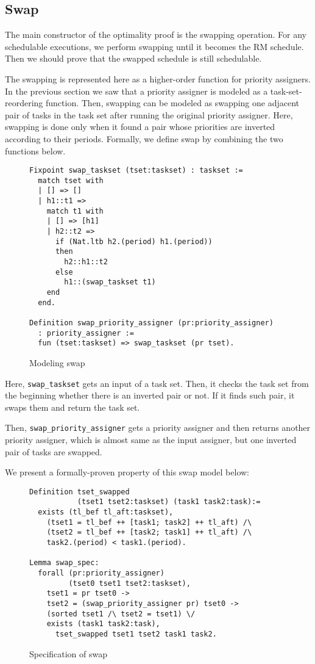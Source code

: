 \documentclass[nocopyrightspace]{sigplanconf}
\begin{document}
\subsection{Swap}

The main constructor of the optimality proof is the swapping operation. For any schedulable executions, we perform
swapping until it becomes the RM schedule. Then we should prove that the swapped schedule is still schedulable.

The swapping is represented here as a higher-order function for priority assigners. In the previous section we saw
that a priority assigner is modeled as a task-set-reordering function. Then, swapping can be modeled as swapping one
adjacent pair of tasks in the task set after running the original priority assigner. Here, swapping is done only when
it found a pair whose priorities are inverted according to their periods. Formally, we define swap by combining the two
functions below.

\begin{figure}[H]
\begin{verbatim}
Fixpoint swap_taskset (tset:taskset) : taskset :=
  match tset with
  | [] => []
  | h1::t1 =>
    match t1 with
    | [] => [h1]
    | h2::t2 =>
      if (Nat.ltb h2.(period) h1.(period))
      then
        h2::h1::t2
      else
        h1::(swap_taskset t1)
    end
  end.

Definition swap_priority_assigner (pr:priority_assigner)
  : priority_assigner :=
  fun (tset:taskset) => swap_taskset (pr tset).
\end{verbatim}
\caption{ Modeling swap }\label{fig:swap}
\end{figure}

Here, \texttt{swap\_taskset} gets an input of a task set. Then, it checks
the task set from the beginning whether there is an inverted pair or not.
If it finds such pair, it swaps them and return the task set.

Then, \texttt{swap\_priority\_assigner} gets a priority assigner and then
returns another priority assigner, which is almost same as the input assigner,
but one inverted pair of tasks are swapped.

We present a formally-proven property of this swap model below:

\begin{figure}[H]
\begin{verbatim}
Definition tset_swapped
           (tset1 tset2:taskset) (task1 task2:task):=
  exists (tl_bef tl_aft:taskset),
    (tset1 = tl_bef ++ [task1; task2] ++ tl_aft) /\
    (tset2 = tl_bef ++ [task2; task1] ++ tl_aft) /\
    task2.(period) < task1.(period).

Lemma swap_spec:
  forall (pr:priority_assigner)
         (tset0 tset1 tset2:taskset),
    tset1 = pr tset0 ->
    tset2 = (swap_priority_assigner pr) tset0 ->
    (sorted tset1 /\ tset2 = tset1) \/
    exists (task1 task2:task),
      tset_swapped tset1 tset2 task1 task2.
\end{verbatim}
\caption{ Specification of swap }\label{fig:swap-spec}
\end{figure}
\end{document}
